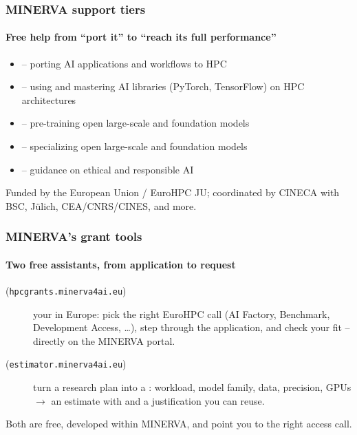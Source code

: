 \documentclass[10pt,aspectratio=169,notheorems]{beamer}
\begin{document}
\begin{frame}
    \frametitle{MINERVA support tiers}
    \framesubtitle{Free help from ``port it'' to ``reach its full performance''}
    \begin{itemize}
        \item {} -- porting AI applications and workflows to HPC
        \item {} -- using and mastering AI libraries (PyTorch, TensorFlow) on HPC architectures
        \item {} -- pre-training open large-scale and foundation models
        \item {} -- specializing open large-scale and foundation models
        \item {} -- guidance on ethical and responsible AI
    \end{itemize}

    \vspace{1em}
    \textcolor{SlidemintMuted}{Funded by the European Union / EuroHPC JU; coordinated by CINECA with BSC, J\"ulich, CEA/CNRS/CINES, and more.}
\end{frame}

\begin{frame}
    \frametitle{MINERVA's grant tools}
    \framesubtitle{Two free assistants, from application to request}
    \begin{description}
        \item[ (\texttt{hpcgrants.minerva4ai.eu})]
        your  in Europe: pick the right
        EuroHPC call (AI Factory, Benchmark, Development Access, \dots), step
        through the application, and check your fit -- directly on the MINERVA
        portal.
        \item[ (\texttt{estimator.minerva4ai.eu})]
        turn a research plan into a :
        workload, model family, data, precision, GPUs $\to$ an estimate with
         and a justification you can reuse.
    \end{description}

    \vspace{1em}
    \textcolor{SlidemintMuted}{Both are free, developed within MINERVA, and point you to the right access call.}
\end{frame}
\end{document}

